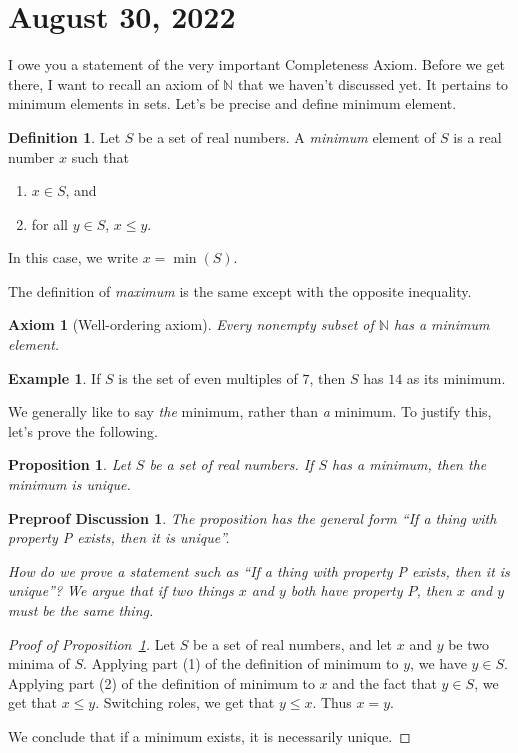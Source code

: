\documentclass[12pt]{amsart}
\newcommand{\N}{\mathbb{N}}
\numberwithin{equation}{section}
\theoremstyle{plain} %
\newtheorem{preproof}{Preproof Discussion}
\newtheorem{prop}[equation]{Proposition}
\newtheorem{axiom}[equation]{Axiom}
\newcommand{\Aug}[1]{\section{August #1, 2022}}
\theoremstyle{definition}
\newtheorem{defn}[equation]{Definition}
\newtheorem{ex}[equation]{Example}
\theoremstyle{remark}
\begin{document}



\Aug{30}

I owe you a statement of the very important Completeness Axiom. Before we get there, I want to recall an axiom of $\N$ that we haven't discussed yet. It pertains to minimum elements in sets. Let's be precise and define minimum element.

\begin{defn} Let $S$ be a set of real numbers. A \emph{minimum} element of $S$ is a real number $x$ such that
\begin{enumerate}\item $x\in S$, and
\item for all $y\in S$, $x\leq y$.
\end{enumerate}
In this case, we write $x=\min(S)$.\index{$\min$}
\end{defn}
The definition of \emph{maximum} is the same except with the opposite inequality.

\begin{axiom}[Well-ordering axiom]\label{Well-ordering axiom}
	Every nonempty subset of $\N$ has a minimum element.
\end{axiom}

\begin{ex} If $S$ is the set of even multiples of $7$, then $S$ has $14$ as its minimum.
\end{ex}

We generally like to say \emph{the} minimum, rather than \emph{a} minimum. To justify this, let's prove the following.

\begin{prop}\label{prop:min-unique} Let $S$ be a set of real numbers. If $S$ has a minimum, then the minimum is unique.
\end{prop}


\begin{preproof} The proposition has the general form  ``If a thing with property P exists, then it is unique''. 
	
  How do we prove a statement such as
  ``If a thing with property P exists, then it is unique''?
  We argue that if two things $x$ and $y$ both have property $P$, then $x$ and $y$ must be the same thing.
\end{preproof}

\begin{proof}[Proof of Proposition~\ref{prop:min-unique}] Let $S$ be a set of real numbers, and let $x$ and $y$ be two minima of $S$. Applying part (1) of the definition of minimum to $y$, we have $y\in S$. Applying part (2) of the definition of minimum to $x$ and the fact that $y\in S$, we get that $x\leq y$. Switching roles, we get that $y\leq x$. Thus $x=y$.

We conclude that if a minimum exists, it is necessarily unique.
\end{proof}
\end{document}
